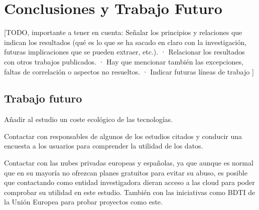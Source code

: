\chapter{Conclusiones y Trabajo Futuro}
\label{cap:conclusiones}


[TODO, importante a tener en cuenta:
Señalar los principios y relaciones que indican los resultados (qué es lo que se ha sacado en claro con la investigación, futuras implicaciones que se pueden extraer, etc.).
· Relacionar los resultados con otros trabajos publicados.
· Hay que mencionar también las excepciones, faltas de correlación o aspectos no resueltos.
· Indicar futuras líneas de trabajo
]

\section*{Trabajo futuro}

Añadir al estudio un coste ecológico de las tecnologías.

Contactar con responsables de algunos de los estudios citados y conducir una encuesta a los usuarios para comprender la utilidad de los datos.

Contactar con las nubes privadas europeas y españolas, ya que aunque es normal que en su mayoría no ofrezcan planes gratuitos para evitar su abuso, es posible que contactando como entidad investigadora dieran acceso a las cloud para poder comprobar su utilidad en este estudio. También con las iniciativas como BDTI de la Unión Europea \citep{BDTIEuropeProject} para probar proyectos como este.